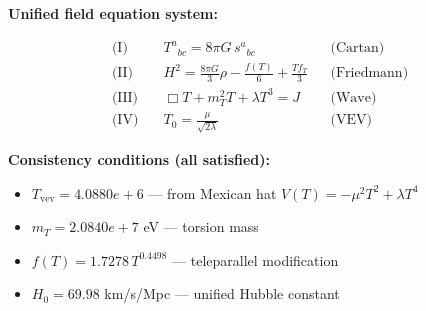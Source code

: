 
\textbf{Unified field equation system:}

\begin{align}
  \text{(I)} \quad & T^a{}_{bc} = 8\pi G \, s^a{}_{bc} && \text{(Cartan)} \\
  \text{(II)} \quad & H^2 = \frac{8\pi G}{3}\rho - \frac{f(T)}{6} + \frac{Tf_T}{3} && \text{(Friedmann)} \\
  \text{(III)} \quad & \Box T + m_T^2 T + \lambda T^3 = J && \text{(Wave)} \\
  \text{(IV)} \quad & T_0 = \frac{\mu}{\sqrt{2\lambda}} && \text{(VEV)}
\end{align}

\textbf{Consistency conditions (all satisfied):}
\begin{itemize}
  \item $T_{\text{vev}} = 4.0880e+6$ — from Mexican hat $V(T) = -\mu^2 T^2 + \lambda T^4$
  \item $m_T = 2.0840e+7$ eV — torsion mass
  \item $f(T) = 1.7278 \, T^{0.4498}$ — teleparallel modification
  \item $H_0 = 69.98$ km/s/Mpc — unified Hubble constant
\end{itemize}